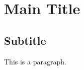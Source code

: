 \hypertarget{main-title}{%
\section{Main Title}\label{main-title}}

\hypertarget{subtitle}{%
\subsection{Subtitle}\label{subtitle}}

This is a paragraph.
